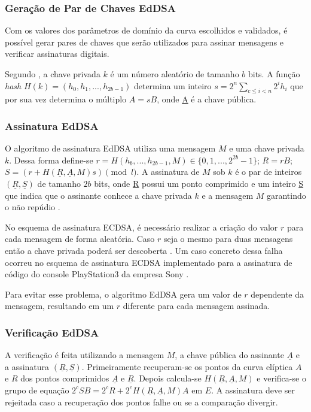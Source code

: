 \subsubsection{Geração de Par de Chaves EdDSA}

Com os valores dos parâmetros de domínio da curva escolhidos e validados, é possível gerar pares de chaves que serão utilizados para assinar mensagens e verificar assinaturas digitais.

Segundo , a chave privada $k$ é um número aleatório de tamanho $b$ bits. A função \textit{hash} $H(k) = (h_0,h_1,...,h_{2b-1})$ determina um inteiro $s = 2^n \sum_{c \le i < n} 2^ih_i$ que por sua vez determina o múltiplo $A = sB$, onde \underline{A} é a chave pública.

\subsubsection{Assinatura EdDSA}

O algoritmo de assinatura EdDSA utiliza uma mensagem $M$ e uma chave privada $k$. Dessa forma define-se $r = H(h_b, ..., h_{2b-1}, M) \in \{ 0, 1, ..., 2^{2b} - 1 \}$; $R = rB$; $S = (r + H(\underline{R}, \underline{A}, M)s) \pmod{l}$. A assinatura de $M$ sob $k$ é o par de inteiros $(\underline{R}, \underline{S})$ de tamanho $2b$ bits, onde \underline{R} possui um ponto comprimido e um inteiro \underline{S} que indica que o assinante conhece a chave privada $k$ e a mensagem $M$  garantindo o não repúdio \cite{bernstein2015eddsa}.

No esquema de assinatura ECDSA, é necessário realizar a criação do valor $r$ para cada mensagem de forma aleatória. Caso $r$ seja o mesmo para duas mensagens então a chave privada poderá ser descoberta \cite{ElGamalCrypto}. Um caso concreto dessa falha ocorreu no esquema de assinatura ECDSA implementado para a assinatura de código do console PlayStation3 da empresa Sony \cite{ps32010}.

Para evitar esse problema, o algoritmo EdDSA gera um valor de $r$ dependente da mensagem, resultando em um $r$ diferente para cada mensagem assinada.

\subsubsection{Verificação EdDSA}

A verificação é feita utilizando a mensagem $M$, a chave pública do assinante $\underline{A}$ e a assinatura $(\underline{R}, \underline{S})$. Primeiramente recuperam-se os pontos da curva elíptica $A$ e $R$ dos pontos comprimidos $\underline{A}$ e $\underline{R}$. Depois calcula-se $H(\underline{R}, \underline{A}, M)$ e verifica-se o grupo de equação $2^cSB = 2^cR + 2^cH(\underline{R}, \underline{A}, M)A$ em $E$. A assinatura deve ser rejeitada caso a recuperação dos pontos falhe ou se a comparação divergir. 
